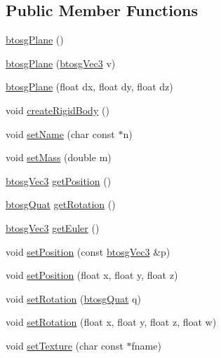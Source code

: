 \subsection*{Public Member Functions}
\begin{DoxyCompactItemize}
\item 
\mbox{\hyperlink{classbtosgPlane_a363737cea03a886470a1a46003706268}{btosg\+Plane}} ()
\item 
\mbox{\hyperlink{classbtosgPlane_a56b020a475b1c955fc50d5c1f6d4d754}{btosg\+Plane}} (\mbox{\hyperlink{classbtosgVec3}{btosg\+Vec3}} v)
\item 
\mbox{\hyperlink{classbtosgPlane_a295ebe4cb55a2786764c7840d10895f4}{btosg\+Plane}} (float dx, float dy, float dz)
\item 
void \mbox{\hyperlink{classbtosgPlane_a0e6812c186ed1fa128dccf7cd2e525a6}{create\+Rigid\+Body}} ()
\item 
void \mbox{\hyperlink{classbtosgObject_ab06a1b3f357209214c6440cd5746523e}{set\+Name}} (char const $\ast$n)
\item 
void \mbox{\hyperlink{classbtosgObject_a91da93c82d48b86192f0cbb16054fe57}{set\+Mass}} (double m)
\item 
\mbox{\hyperlink{classbtosgVec3}{btosg\+Vec3}} \mbox{\hyperlink{classbtosgObject_a3dadd5da8f2a312e44a039446b93d4cd}{get\+Position}} ()
\item 
\mbox{\hyperlink{classbtosgQuat}{btosg\+Quat}} \mbox{\hyperlink{classbtosgObject_a3b825999ad3a51bde743d4085ff19dae}{get\+Rotation}} ()
\item 
\mbox{\hyperlink{classbtosgVec3}{btosg\+Vec3}} \mbox{\hyperlink{classbtosgObject_a2019ec63bde02b72600450c7c985e77a}{get\+Euler}} ()
\item 
void \mbox{\hyperlink{classbtosgObject_ace6b51040b7ddce90818174200cc6074}{set\+Position}} (const \mbox{\hyperlink{classbtosgVec3}{btosg\+Vec3}} \&p)
\item 
void \mbox{\hyperlink{classbtosgObject_adb9f2cff0faf66dc252cd7c97b11ac84}{set\+Position}} (float x, float y, float z)
\item 
void \mbox{\hyperlink{classbtosgObject_a6365748d5506bb9da31907c9988071fa}{set\+Rotation}} (\mbox{\hyperlink{classbtosgQuat}{btosg\+Quat}} q)
\item 
void \mbox{\hyperlink{classbtosgObject_a4d21ca59b944fd26644db35d3e9ba67a}{set\+Rotation}} (float x, float y, float z, float w)
\item 
void \mbox{\hyperlink{classbtosgObject_aff54acbc7c66811efb0cf2838107a241}{set\+Texture}} (char const $\ast$fname)

\end{DoxyCompactItemize}

